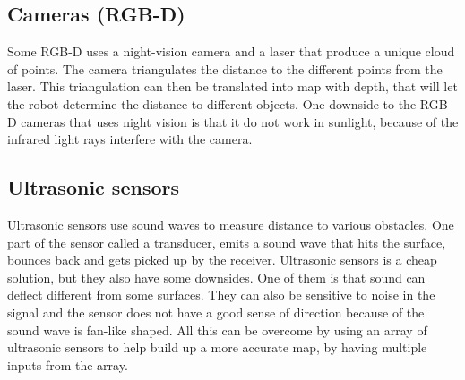 \subsection{Cameras (RGB-D) }

Some RGB-D uses a night-vision camera and a laser that produce a unique cloud of points. The camera triangulates the distance to the different points from the laser. This triangulation can then be translated into map with depth, that will let the robot determine the distance to different objects. 
One downside to the RGB-D cameras that uses night vision is that it do not work in sunlight, because of the infrared light rays interfere with the camera\cite{Cameras}.

\subsection{Ultrasonic sensors}
Ultrasonic sensors use sound waves to measure distance to various obstacles. One part of the sensor called a transducer, emits a sound wave that hits the surface, bounces back and gets picked up by the receiver. 
Ultrasonic sensors is a cheap solution, but they also have some downsides. One of them is that sound can deflect different from some surfaces. They can also be sensitive to noise in the signal and the sensor does not have a good sense of direction because of the sound wave is fan-like shaped. All this can be overcome by using an array of ultrasonic sensors to help build up a more accurate map, by having multiple inputs from the array\cite{Ultrasonicsnesor}.
